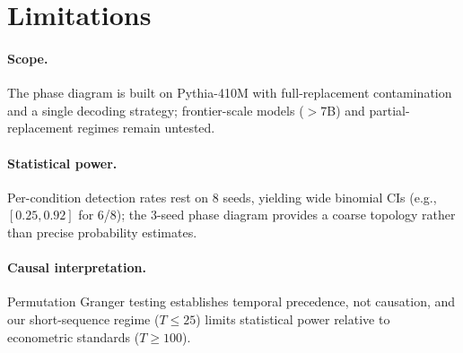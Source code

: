 \section*{Limitations}
\label{sec:limitations}

\paragraph{Scope.}
The phase diagram is built on Pythia-410M with full-replacement contamination and a single decoding strategy; frontier-scale models (${>}$7B) and partial-replacement regimes remain untested.

\paragraph{Statistical power.}
Per-condition detection rates rest on 8 seeds, yielding wide binomial CIs (e.g., $[0.25, 0.92]$ for 6/8); the 3-seed phase diagram provides a coarse topology rather than precise probability estimates.

\paragraph{Causal interpretation.}
Permutation Granger testing establishes temporal precedence, not causation, and our short-sequence regime ($T{\leq}25$) limits statistical power relative to econometric standards ($T{\geq}100$).
